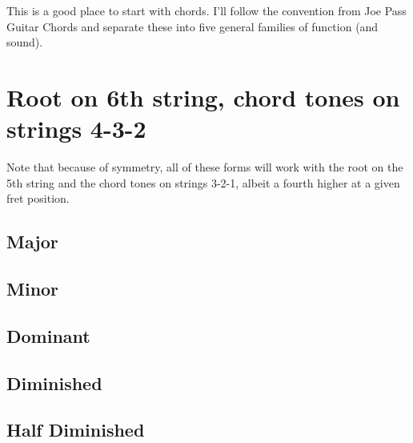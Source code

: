 
This is a good place to start with chords.  I'll follow the convention from Joe Pass Guitar Chords and separate these into five general families of function (and sound).

\section{Root on 6th string, chord tones on strings 4-3-2}

Note that because of symmetry, all of these forms will work with the root on the 5th string and the chord tones on strings 3-2-1, albeit a fourth higher at a given fret position.

\subsection{Major}

\mediumchords
\def\numfrets{6}

\subsection{Minor}


\subsection{Dominant}
\chords{

}

\subsection{Diminished}

\subsection{Half Diminished}

